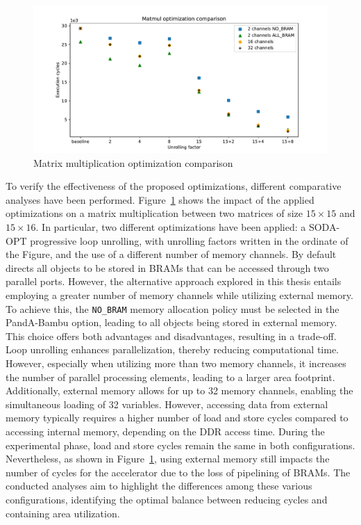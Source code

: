 \documentclass[11pt,a4paper,twocolumn]{article}
\begin{document}
\begin{figure}[t]
    \centering
    \includegraphics[height=0.24\textwidth]{Images/matmul_comparison15}
    \caption{Matrix multiplication optimization comparison}
    \label{fig:matmul-opts-comparison}
\end{figure}

To verify the effectiveness of the proposed optimizations, different comparative analyses have been performed.
Figure~\ref{fig:matmul-opts-comparison} shows the impact of the applied optimizations on a matrix multiplication between two matrices of size $15 \times 15$ and $15 \times 16$.
In particular, two different optimizations have been applied: a SODA-OPT progressive loop unrolling, with unrolling factors written in the ordinate of the Figure, and the use of a different number of memory channels.
By default directs all objects to be stored in BRAMs that can be accessed through two parallel ports.
However, the alternative approach explored in this thesis entails employing a greater number of memory channels while utilizing external memory.
To achieve this, the \lstinline{NO_BRAM} memory allocation policy must be selected in the PandA-Bambu option, leading to all objects being stored in external memory.
This choice offers both advantages and disadvantages, resulting in a trade-off.
Loop unrolling enhances parallelization, thereby reducing computational time.
However, especially when utilizing more than two memory channels, it increases the number of parallel processing elements, leading to a larger area footprint.
Additionally, external memory allows for up to 32 memory channels, enabling the simultaneous loading of 32 variables.
However, accessing data from external memory typically requires a higher number of load and store cycles compared to accessing internal memory, depending on the DDR access time.
During the experimental phase, load and store cycles remain the same in both configurations.
Nevertheless, as shown in Figure~\ref{fig:matmul-opts-comparison}, using external memory still impacts the number of cycles for the accelerator due to the loss of pipelining of BRAMs.
The conducted analyses aim to highlight the differences among these various configurations, identifying the optimal balance between reducing cycles and containing area utilization.
\end{document}
